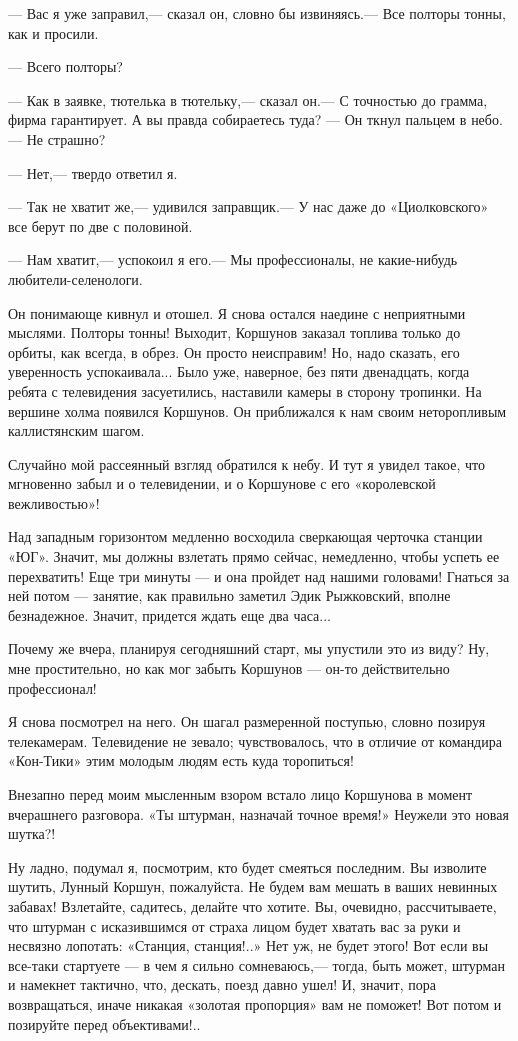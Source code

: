 \documentclass[11pt,a4paper,oneside]{article}
\begin{document}
— Вас я уже заправил,— сказал он, словно бы извиняясь.— Все полторы тонны, как и просили.

— Всего полторы?

— Как в заявке, тютелька в тютельку,— сказал он.— С точностью до грамма, фирма гарантирует. А вы правда собираетесь туда? — Он ткнул пальцем в небо.— Не страшно?

— Нет,— твердо ответил я.

— Так не хватит же,— удивился заправщик.— У нас даже до «Циолковского» все берут по две с половиной.

— Нам хватит,— успокоил я его.— Мы профессионалы, не какие-нибудь любители-селенологи.

Он понимающе кивнул и отошел. Я снова остался наедине с неприятными мыслями. Полторы тонны! Выходит, Коршунов заказал топлива только до орбиты, как всегда, в обрез. Он просто неисправим! Но, надо сказать, его уверенность успокаивала... Было уже, наверное, без пяти двенадцать, когда ребята с телевидения засуетились, наставили камеры в сторону тропинки. На вершине холма появился Коршунов. Он приближался к нам своим неторопливым каллистянским шагом.

Случайно мой рассеянный взгляд обратился к небу. И тут я увидел такое, что мгновенно забыл и о телевидении, и о Коршунове с его «королевской вежливостью»!

Над западным горизонтом медленно восходила сверкающая черточка станции «ЮГ». Значит, мы должны взлетать прямо сейчас, немедленно, чтобы успеть ее перехватить! Еще три минуты — и она пройдет над нашими головами! Гнаться за ней потом — занятие, как правильно заметил Эдик Рыжковский, вполне безнадежное. Значит, придется ждать еще два часа...

Почему же вчера, планируя сегодняшний старт, мы упустили это из виду? Ну, мне простительно, но как мог забыть Коршунов — он-то действительно профессионал!

Я снова посмотрел на него. Он шагал размеренной поступью, словно позируя телекамерам. Телевидение не зевало; чувствовалось, что в отличие от командира «Кон-Тики» этим молодым людям есть куда торопиться!

Внезапно перед моим мысленным взором встало лицо Коршунова в момент вчерашнего разговора. «Ты штурман, назначай точное время!» Неужели это новая шутка?!

Ну ладно, подумал я, посмотрим, кто будет смеяться последним. Вы изволите шутить, Лунный Коршун, пожалуйста. Не будем вам мешать в ваших невинных забавах! Взлетайте, садитесь, делайте что хотите. Вы, очевидно, рассчитываете, что штурман с исказившимся от страха лицом будет хватать вас за руки и несвязно лопотать: «Станция, станция!..» Нет уж, не будет этого! Вот если вы все-таки стартуете — в чем я сильно сомневаюсь,— тогда, быть может, штурман и намекнет тактично, что, дескать, поезд давно ушел! И, значит, пора возвращаться, иначе никакая «золотая пропорция» вам не поможет! Вот потом и позируйте перед объективами!..
\end{document}
